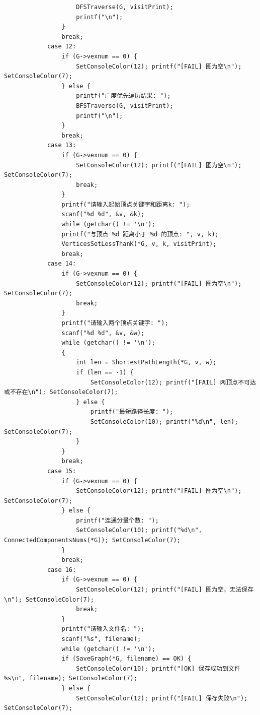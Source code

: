 \documentclass[supercite]{Experimental_Report}
\begin{document}
{\begin{lstlisting}
                    DFSTraverse(G, visitPrint);
                    printf("\n");
                }
                break;
            case 12:
                if (G->vexnum == 0) {
                    SetConsoleColor(12); printf("[FAIL] 图为空\n"); SetConsoleColor(7);
                } else {
                    printf("广度优先遍历结果: ");
                    BFSTraverse(G, visitPrint);
                    printf("\n");
                }
                break;
            case 13:
                if (G->vexnum == 0) {
                    SetConsoleColor(12); printf("[FAIL] 图为空\n"); SetConsoleColor(7);
                    break;
                }
                printf("请输入起始顶点关键字和距离k: ");
                scanf("%d %d", &v, &k);
                while (getchar() != '\n');
                printf("与顶点 %d 距离小于 %d 的顶点: ", v, k);
                VerticesSetLessThanK(*G, v, k, visitPrint);
                break;
            case 14:
                if (G->vexnum == 0) {
                    SetConsoleColor(12); printf("[FAIL] 图为空\n"); SetConsoleColor(7);
                    break;
                }
                printf("请输入两个顶点关键字: ");
                scanf("%d %d", &v, &w);
                while (getchar() != '\n');
                {
                    int len = ShortestPathLength(*G, v, w);
                    if (len == -1) {
                        SetConsoleColor(12); printf("[FAIL] 两顶点不可达或不存在\n"); SetConsoleColor(7);
                    } else {
                        printf("最短路径长度: ");
                        SetConsoleColor(10); printf("%d\n", len); SetConsoleColor(7);
                    }
                }
                break;
            case 15:
                if (G->vexnum == 0) {
                    SetConsoleColor(12); printf("[FAIL] 图为空\n"); SetConsoleColor(7);
                } else {
                    printf("连通分量个数: ");
                    SetConsoleColor(10); printf("%d\n", ConnectedComponentsNums(*G)); SetConsoleColor(7);
                }
                break;
            case 16:
                if (G->vexnum == 0) {
                    SetConsoleColor(12); printf("[FAIL] 图为空，无法保存\n"); SetConsoleColor(7);
                    break;
                }
                printf("请输入文件名: ");
                scanf("%s", filename);
                while (getchar() != '\n');
                if (SaveGraph(*G, filename) == OK) {
                    SetConsoleColor(10); printf("[OK] 保存成功到文件 %s\n", filename); SetConsoleColor(7);
                } else {
                    SetConsoleColor(12); printf("[FAIL] 保存失败\n"); SetConsoleColor(7);

\end{lstlisting}}
\end{document}
